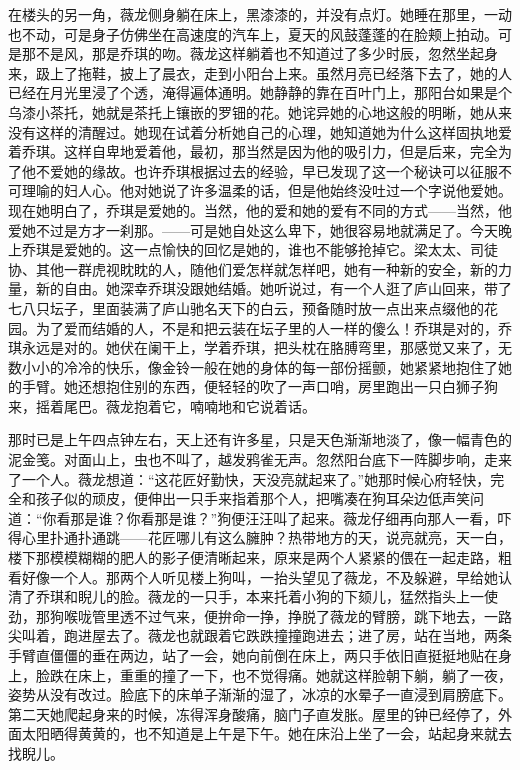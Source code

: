 \par 在楼头的另一角，薇龙侧身躺在床上，黑漆漆的，并没有点灯。她睡在那里，一动也不动，可是身子仿佛坐在高速度的汽车上，夏天的风鼓蓬蓬的在脸颊上拍动。可是那不是风，那是乔琪的吻。薇龙这样躺着也不知道过了多少时辰，忽然坐起身来，趿上了拖鞋，披上了晨衣，走到小阳台上来。虽然月亮已经落下去了，她的人已经在月光里浸了个透，淹得遍体通明。她静静的靠在百叶门上，那阳台如果是个乌漆小茶托，她就是茶托上镶嵌的罗钿的花。她诧异她的心地这般的明晰，她从来没有这样的清醒过。她现在试着分析她自己的心理，她知道她为什么这样固执地爱着乔琪。这样自卑地爱着他，最初，那当然是因为他的吸引力，但是后来，完全为了他不爱她的缘故。也许乔琪根据过去的经验，早已发现了这一个秘诀可以征服不可理喻的妇人心。他对她说了许多温柔的话，但是他始终没吐过一个字说他爱她。现在她明白了，乔琪是爱她的。当然，他的爱和她的爱有不同的方式——当然，他爱她不过是方才一刹那。——可是她自处这么卑下，她很容易地就满足了。今天晚上乔琪是爱她的。这一点愉快的回忆是她的，谁也不能够抢掉它。梁太太、司徒协、其他一群虎视眈眈的人，随他们爱怎样就怎样吧，她有一种新的安全，新的力量，新的自由。她深幸乔琪没跟她结婚。她听说过，有一个人逛了庐山回来，带了七八只坛子，里面装满了庐山驰名天下的白云，预备随时放一点出来点缀他的花园。为了爱而结婚的人，不是和把云装在坛子里的人一样的傻么！乔琪是对的，乔琪永远是对的。她伏在阑干上，学着乔琪，把头枕在胳膊弯里，那感觉又来了，无数小小的冷冷的快乐，像金铃一般在她的身体的每一部份摇颤，她紧紧地抱住了她的手臂。她还想抱住别的东西，便轻轻的吹了一声口哨，房里跑出一只白狮子狗来，摇着尾巴。薇龙抱着它，喃喃地和它说着话。
\par 那时已是上午四点钟左右，天上还有许多星，只是天色渐渐地淡了，像一幅青色的泥金笺。对面山上，虫也不叫了，越发鸦雀无声。忽然阳台底下一阵脚步响，走来了一个人。薇龙想道：“这花匠好勤快，天没亮就起来了。”她那时候心府轻快，完全和孩子似的顽皮，便伸出一只手来指着那个人，把嘴凑在狗耳朵边低声笑问道：“你看那是谁？你看那是谁？”狗便汪汪叫了起来。薇龙仔细再向那人一看，吓得心里扑通扑通跳——花匠哪儿有这么臃肿？热带地方的天，说亮就亮，天一白，楼下那模模糊糊的肥人的影子便清晰起来，原来是两个人紧紧的偎在一起走路，粗看好像一个人。那两个人听见楼上狗叫，一抬头望见了薇龙，不及躲避，早给她认清了乔琪和睨儿的脸。薇龙的一只手，本来托着小狗的下颏儿，猛然指头上一使劲，那狗喉咙管里透不过气来，便拚命一挣，挣脱了薇龙的臂膀，跳下地去，一路尖叫着，跑进屋去了。薇龙也就跟着它跌跌撞撞跑进去；进了房，站在当地，两条手臂直僵僵的垂在两边，站了一会，她向前倒在床上，两只手依旧直挺挺地贴在身上，脸跌在床上，重重的撞了一下，也不觉得痛。她就这样脸朝下躺，躺了一夜，姿势从没有改过。脸底下的床单子渐渐的湿了，冰凉的水晕子一直浸到肩膀底下。第二天她爬起身来的时候，冻得浑身酸痛，脑门子直发胀。屋里的钟已经停了，外面太阳晒得黄黄的，也不知道是上午是下午。她在床沿上坐了一会，站起身来就去找睨儿。
